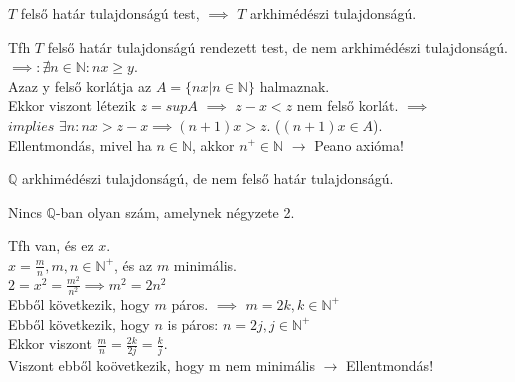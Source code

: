 \begin{frame}
\begin{tcolorbox}[title={Tétel: Felső határ és arkhimédészi tulajdonság}]
$T$ felső határ tulajdonságú test, $\implies$ $T$ arkhimédészi tulajdonságú.
\end{tcolorbox}

\begin{tcolorbox}[title={Bizonyítás (Indirekt)}]
Tfh $T$ felső határ tulajdonságú rendezett test, de nem arkhimédészi tulajdonságú.\\
$\implies : {\nexists}n \in \mathbb{N} : nx \geq y$.\\
Azaz y felső korlátja az $A = \{ nx | n \in \mathbb{N} \}$ halmaznak.\\
Ekkor viszont létezik $z = sup A$ $\implies$ $z - x < z$ nem felső korlát. $\implies$\\
$implies$ ${\exists}n : nx > z - x \implies (n + 1)x > z$. ($(n + 1)x \in A$).\\
Ellentmondás, mivel ha $n \in \mathbb{N}$, akkor $n^+ \in \mathbb{N}$ $\rightarrow$ Peano axióma!
\end{tcolorbox}
\end{frame}

\begin{frame}
\begin{tcolorbox}[title={Tétel: Q nem felső határ tulajdonságú}]
$\mathbb{Q}$ arkhimédészi tulajdonságú, de nem felső határ tulajdonságú.
\end{tcolorbox}
\end{frame}


\begin{frame}
\begin{tcolorbox}[title={Tétel: $\sqrt{2}$ nem racionális}]
Nincs $\mathbb{Q}$-ban olyan szám, amelynek négyzete 2.
\end{tcolorbox}

\begin{tcolorbox}[title={Bizonyítás (Indirekt)}]
Tfh van, és ez $x$.\\
$x = \frac{m}{n}, m,n \in \mathbb{N}^+$, és az $m$ minimális.\\
$2 = x^2 = \frac{m^2}{n^2} \implies m^2 = 2n^2$\\
Ebből következik, hogy $m$ páros. $\implies$ $m = 2k, k \in \mathbb{N}^+$\\
Ebből következik, hogy $n$ is páros: $n = 2j, j \in \mathbb{N}^+$\\
Ekkor viszont $\frac{m}{n} = \frac{2k}{2j} = \frac{k}{j}$.\\
Viszont ebből koövetkezik, hogy m nem minimális $\rightarrow$ Ellentmondás!
\end{tcolorbox}
\end{frame}

